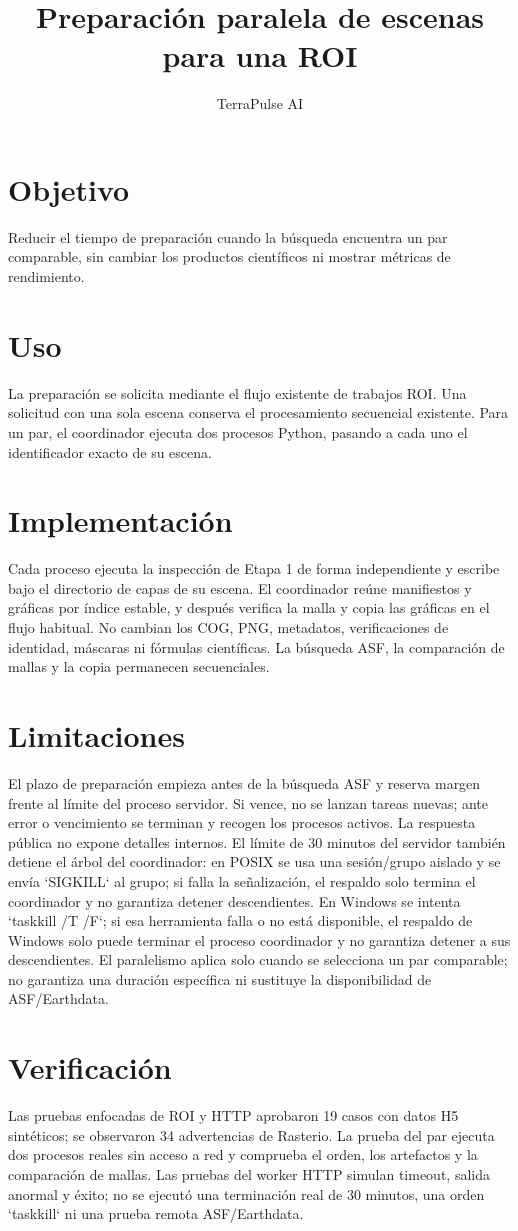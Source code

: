\documentclass[12pt]{article}
\title{Preparación paralela de escenas para una ROI}
\author{TerraPulse AI}
\date{}
\begin{document}
\maketitle
\section{Objetivo}
Reducir el tiempo de preparación cuando la búsqueda encuentra un par comparable, sin cambiar los productos científicos ni mostrar métricas de rendimiento.
\section{Uso}
La preparación se solicita mediante el flujo existente de trabajos ROI. Una solicitud con una sola escena conserva el procesamiento secuencial existente. Para un par, el coordinador ejecuta dos procesos Python, pasando a cada uno el identificador exacto de su escena.
\section{Implementación}
Cada proceso ejecuta la inspección de Etapa 1 de forma independiente y escribe bajo el directorio de capas de su escena. El coordinador reúne manifiestos y gráficas por índice estable, y después verifica la malla y copia las gráficas en el flujo habitual. No cambian los COG, PNG, metadatos, verificaciones de identidad, máscaras ni fórmulas científicas. La búsqueda ASF, la comparación de mallas y la copia permanecen secuenciales.
\section{Limitaciones}
El plazo de preparación empieza antes de la búsqueda ASF y reserva margen frente al límite del proceso servidor. Si vence, no se lanzan tareas nuevas; ante error o vencimiento se terminan y recogen los procesos activos. La respuesta pública no expone detalles internos. El límite de 30 minutos del servidor también detiene el árbol del coordinador: en POSIX se usa una sesión/grupo aislado y se envía `SIGKILL` al grupo; si falla la señalización, el respaldo solo termina el coordinador y no garantiza detener descendientes. En Windows se intenta `taskkill /T /F`; si esa herramienta falla o no está disponible, el respaldo de Windows solo puede terminar el proceso coordinador y no garantiza detener a sus descendientes. El paralelismo aplica solo cuando se selecciona un par comparable; no garantiza una duración específica ni sustituye la disponibilidad de ASF/Earthdata.
\section{Verificación}
Las pruebas enfocadas de ROI y HTTP aprobaron 19 casos con datos H5 sintéticos; se observaron 34 advertencias de Rasterio. La prueba del par ejecuta dos procesos reales sin acceso a red y comprueba el orden, los artefactos y la comparación de mallas. Las pruebas del worker HTTP simulan timeout, salida anormal y éxito; no se ejecutó una terminación real de 30 minutos, una orden `taskkill` ni una prueba remota ASF/Earthdata.
\end{document}
